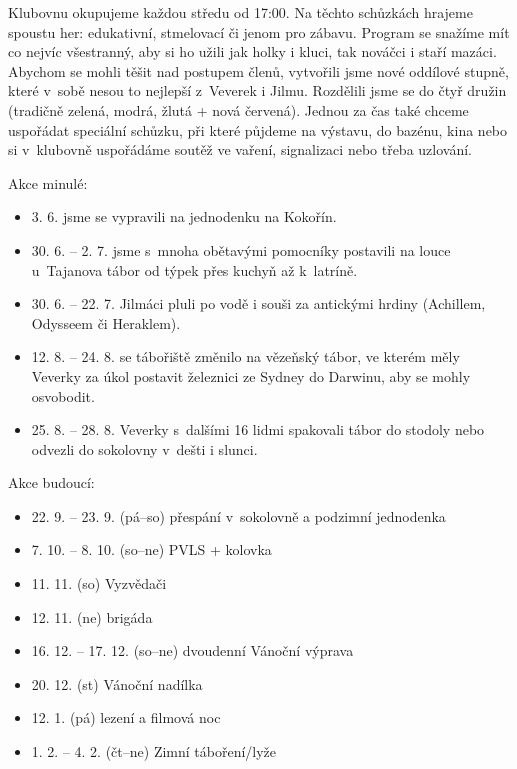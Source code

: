 \documentclass[11pt]{article}
\begin{document}
Klubovnu okupujeme každou středu od 17:00. Na těchto schůzkách hrajeme spoustu her: edukativní, stmelovací či jenom pro zábavu. Program se snažíme mít co nejvíc všestranný, aby si ho užili jak holky i kluci, tak nováčci i staří mazáci. Abychom se mohli těšit nad postupem členů, vytvořili jsme nové oddílové stupně, které v~sobě nesou to nejlepší z~Veverek i Jilmu. Rozdělili jsme se do čtyř družin (tradičně zelená, modrá, žlutá + nová červená). Jednou za čas také chceme uspořádat speciální schůzku, při které půjdeme na výstavu, do bazénu, kina nebo si v~klubovně uspořádáme soutěž ve vaření, signalizaci nebo třeba uzlování.

\vspace*{12pt}\noindent
Akce minulé:
\begin{itemize}[
  itemsep=-3pt,
  leftmargin=2em,
  itemindent=-1em
]
  \item[] 3. 6. jsme se vypravili na jednodenku na Kokořín.
  \item[] 30. 6. –⁠ 2. 7. jsme s~mnoha obětavými pomocníky postavili na louce u~Tajanova tábor od týpek přes kuchyň až k~latríně.
  \item[] 30. 6. –⁠ 22. 7. Jilmáci pluli po vodě i souši za antickými hrdiny (Achillem, Odysseem či Heraklem).
  \item[] 12. 8. –⁠ 24. 8. se tábořiště změnilo na vězeňský tábor, ve kterém měly Veverky za úkol postavit železnici ze Sydney do Darwinu, aby se mohly osvobodit.
  \item[] 25. 8. –⁠ 28. 8. Veverky s~dalšími 16 lidmi spakovali tábor do stodoly nebo odvezli do sokolovny v~dešti i slunci.
\end{itemize}
\vspace*{6pt}
\noindent
Akce budoucí:
\begin{itemize}[
  itemsep=-3pt,
  leftmargin=2em,
  itemindent=-1em
]
  \item[] 22. 9. –⁠ 23. 9. (pá–⁠so) přespání v~sokolovně a podzimní jednodenka
  \item[] 7. 10. –⁠ 8. 10. (so–⁠ne) PVLS + kolovka
  \item[] 11. 11. (so) Vyzvědači
  \item[] 12. 11. (ne) brigáda
  \item[] 16. 12. –⁠ 17. 12. (so–⁠ne) dvoudenní Vánoční výprava
  \item[] 20. 12. (st) Vánoční nadílka
  \item[] 12. 1. (pá) lezení a filmová noc
  \item[] 1. 2. –⁠ 4. 2.  (čt–⁠ne) Zimní táboření/lyže
\end{itemize}
\end{document}
